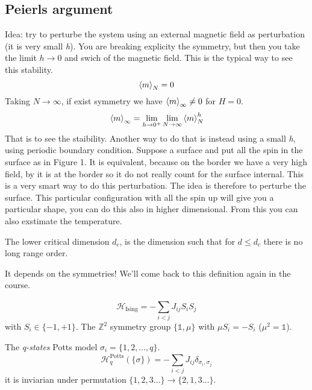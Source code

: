 \documentclass[../main/main.tex]{subfiles}
\begin{document}
\subsection{Peierls argument}
Idea: try to perturbe the system using an external magnetic field as perturbation (it is very small \emph{h}). You are breaking explicity the symmetry, but then you take the limit \( h \rightarrow 0 \) and swich of the magnetic field. This is the typical way to see this stability.
\begin{equation}
  \expval{m}_N = 0
\end{equation}
Taking \( N \rightarrow \infty  \), if exist symmetry we have \( \expval{m}_{\infty } \neq 0  \) for \( H=0 \).
\begin{equation}
  \expval{m}_{\infty } = \lim_{h \rightarrow 0^+} \lim_{N \rightarrow \infty } \expval{m}_N^h
\end{equation}
That is to see the staibility.  Another way to do that is instead using a small \emph{h}, using periodic boundary condition. Suppose a surface and put all the spin in the surface as in Figure 1. It is equivalent, because on the border we have a very high field, by it is at the border so it do not really count for the surface internal. This is a very smart way to do this perturbation.  The idea is therefore to perturbe the surface.
This particular configuration with all the spin up will give you a particular shape, you can do this also in higher dimensional. From this you can also exstimate the temperature.

\begin{definition}
  The lower critical dimension \( d_c \), is the dimension such that for \( d \le d_c \) there is no long range order.
\end{definition}
\begin{remark}
It depends on the symmetries! We'll come back to this definition again in the course.
\end{remark}

\begin{equation}
  \mathcal{H}_{\text{Ising}} = - \sum_{i<j}^{} J_{ij} S_i S_j
\end{equation}
with \( S_i \in \{ -1,+1 \}   \). The \( \mathbb{Z}^2 \) symmetry group \( \{ \mathbb{1}, \mu  \}   \) with \( \mu S_i = - S_i \) (\( \mu ^2 = \mathbb{1} \)).


The \emph{q-states} Potts model \( \sigma _i = \{ 1,2, \dots,q \}   \).
\begin{equation}
  \mathcal{H}^{\text{Potts}}_q ( \{ \sigma  \}  ) = - \sum_{i<j}^{} J_{ij} \delta _{\sigma _i,\sigma _j}
\end{equation}
it is inviarian under permutation \( \{ 1,2,3 \dots \} \rightarrow \{ 2,1,3 \dots \}    \).
\end{document}
